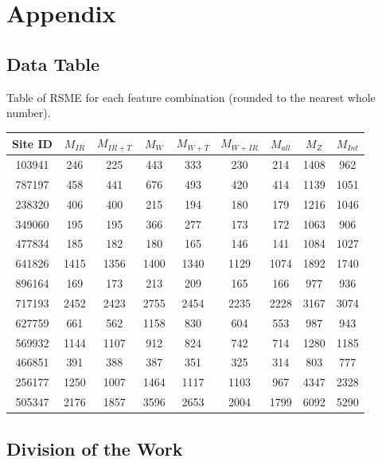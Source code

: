 \documentclass[11pt, fullpage,letterpaper]{article}
\begin{document}
\clearpage




\section*{Appendix}

\subsection*{Data Table}
Table of RSME for each feature combination (rounded to the nearest whole number).
\begin{center}
    \begin{tabular}{|c|c|c|c|c|c|c|c|c|}
        \hline
        Site ID & $M_{IR}$ & $M_{IR + T}$ & $M_{W}$ & $M_{W + T}$ & $M_{W + IR}$ & $M_{all}$ & $M_{Z}$ & $M_{Int}$ \\
        \hline
        103941 & 246&225&443&333&230&214&1408&962 \\
        \hline
        787197&458&441&676&493&420&414&1139&1051 \\
        \hline
        238320&406&400&215&194&180&179&1216&1046 \\
        \hline
        349060&195&195&366&277&173&172&1063&906 \\
        \hline
        477834&185&182&180&165&146&141&1084&1027 \\
        \hline
        641826&1415&1356&1400&1340&1129&1074&1892&1740 \\
        \hline
        896164&169&173&213&209&165&166&977&936 \\
        \hline
        717193&2452&2423&2755&2454&2235&2228&3167&3074 \\
        \hline
        627759&661&562&1158&830&604&553&987&943\\
        \hline
        569932&1144&1107&912&824&742&714&1280&1185 \\
        \hline
        466851&391&388&387&351&325&314&803&777 \\
        \hline
        256177&1250&1007&1464&1117&1103&967&4347&2328 \\
        \hline
        505347&2176&1857&3596&2653&2004&1799&6092&5290 \\
        \hline

    \end{tabular}
\end{center}

\subsection*{Division of the Work}
\end{document}
